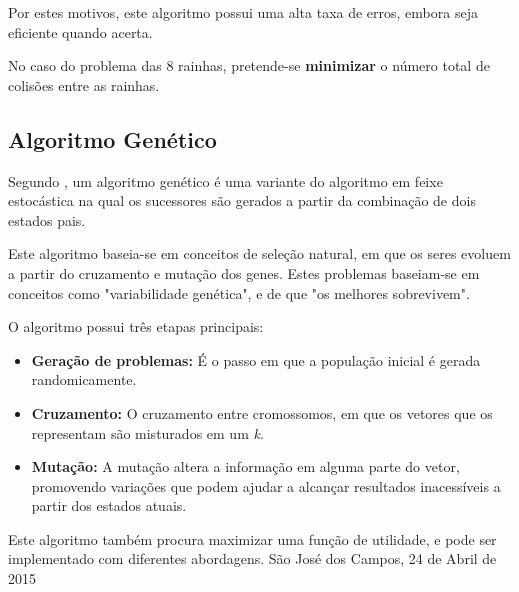 \documentclass[conference]{IEEEtran}
\begin{document}
Por estes motivos, este algoritmo possui uma alta taxa de erros, embora seja eficiente quando acerta.

 No caso do problema das 8 rainhas, pretende-se \textbf{minimizar} o número total de colisões entre as rainhas.


\subsection{Algoritmo Genético}
Segundo \cite{norvig2014inteligencia}, um algoritmo genético é uma variante do algoritmo em feixe estocástica
na qual os sucessores são gerados a partir da combinação de dois estados pais.

Este algoritmo baseia-se em conceitos de seleção natural, em que os seres evoluem a partir do cruzamento e mutação
dos genes. Estes problemas baseiam-se em conceitos como "variabilidade genética", e de que "os melhores sobrevivem".

O algoritmo possui três etapas principais:
\begin{itemize}
	\item \textbf{Geração de problemas: } É o passo em que a população inicial é gerada randomicamente. 
	\item \textbf{Cruzamento: } O cruzamento entre cromossomos, em que os vetores que os representam são misturados em um \textit{k}.
	\item \textbf{Mutação: } A mutação altera a informação em alguma parte do vetor, promovendo variações que podem ajudar a alcançar resultados inacessíveis a partir dos estados atuais.
\end{itemize}

Este algoritmo também procura maximizar uma função de utilidade, e pode ser implementado com diferentes abordagens.
\hfill São José dos Campos, 24 de Abril de 2015

%

\end{document}
